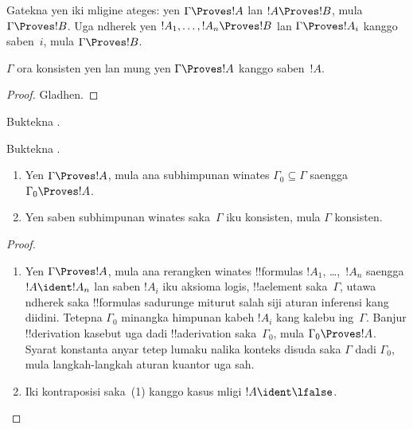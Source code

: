 \documentclass[../../../include/open-logic-section]{subfiles}
\begin{document}
Gatekna yen iki mligine ateges: yen $\Gamma \Proves !A$ lan $!A
\Proves !B$, mula $\Gamma \Proves !B$. Uga ndherek yen $!A_1,
\dots, !A_n \Proves !B$ lan $\Gamma \Proves !A_i$ kanggo saben~$i$,
mula $\Gamma \Proves !B$.

\begin{prop}
$\Gamma$ ora konsisten yen lan mung yen $\Gamma \Proves !A$ kanggo
saben~$!A$.
\end{prop}

\begin{proof}
Gladhen.
\end{proof}

\begin{prob}
Buktekna .
\end{prob}
\tagendprob

\begin{prob}
Buktekna .
\end{prob}
\tagendprob

\begin{prop}[Kekompakan]
  \begin{enumerate}
  \item Yen $\Gamma \Proves !A$, mula ana subhimpunan winates
    $\Gamma_0 \subseteq \Gamma$ saengga $\Gamma_0 \Proves !A$.
  \item Yen saben subhimpunan winates saka~$\Gamma$ iku konsisten,
    mula $\Gamma$ konsisten.
  \end{enumerate}
\end{prop}

\begin{proof}
  \begin{enumerate}
    \item Yen $\Gamma \Proves !A$, mula ana rerangken winates
      !!{formula}s $!A_1$, \dots,~$!A_n$ saengga $!A \ident !A_n$
      lan saben $!A_i$ iku aksioma logis, !!a{element} saka~$\Gamma$,
      utawa ndherek saka !!{formula}s sadurunge miturut salah siji
      aturan inferensi kang diidini. Tetepna $\Gamma_0$ minangka
      himpunan kabeh $!A_i$ kang kalebu ing~$\Gamma$. Banjur
      !!{derivation} kasebut uga dadi !!a{derivation} saka~$\Gamma_0$,
      mula $\Gamma_0
      \Proves !A$. Syarat konstanta anyar tetep lumaku nalika konteks disuda saka
      $\Gamma$ dadi $\Gamma_0$, mula langkah-langkah aturan kuantor uga sah.
    \item Iki kontraposisi saka~(1) kanggo kasus mligi $!A
      \ident \lfalse$.
\end{enumerate}
\end{proof}
\end{document}
